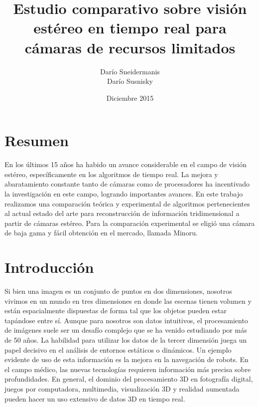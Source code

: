 \documentclass[11pt,a4paper,titlepage]{article}
\title{Estudio comparativo sobre visión estéreo en tiempo real para cámaras de recursos limitados}
\author{Darío Sneidermanis \\ Darío Susnisky}
\date{Diciembre 2015}
\begin{document}
\maketitle
\tableofcontents
\clearpage

\setlength{\parskip}{\baselineskip}

\section{Resumen}

En los últimos 15 años ha habido un avance considerable en el campo de visión estéreo, específicamente en los algoritmos de tiempo real. La mejora y abaratamiento constante tanto de cámaras como de procesadores ha incentivado la investigación en este campo, logrando importantes avances. En este trabajo realizamos una comparación teórica y experimental de algoritmos pertenecientes al actual estado del arte para reconstrucción de información tridimensional a partir de cámaras estéreo. Para la comparación experimental se eligió una cámara de baja gama y fácil obtención en el mercado, llamada Minoru.

\newpage

\section{Introducción}

Si bien una imagen es un conjunto de puntos en dos dimensiones, nosotros vivimos en un mundo en tres dimensiones en donde las escenas tienen volumen y están espacialmente dispuestas de forma tal que los objetos pueden estar tapándose entre sí. Aunque para nosotros son datos intuitivos, el procesamiento de imágenes suele ser un desafío complejo que se ha venido estudiando por más de 50 años. La habilidad para utilizar los datos de la tercer dimensión juega un papel decisivo en el análisis de entornos estáticos o dinámicos. Un ejemplo evidente de uso de esta información es la mejora en la navegación de robots. En el campo médico, las nuevas tecnologías requieren información más precisa sobre profundidades. En general, el dominio del procesamiento 3D en fotografía digital, juegos por computadora, multimedia, visualización 3D y realidad aumentada pueden hacer un uso extensivo de datos 3D en tiempo real.
\end{document}
